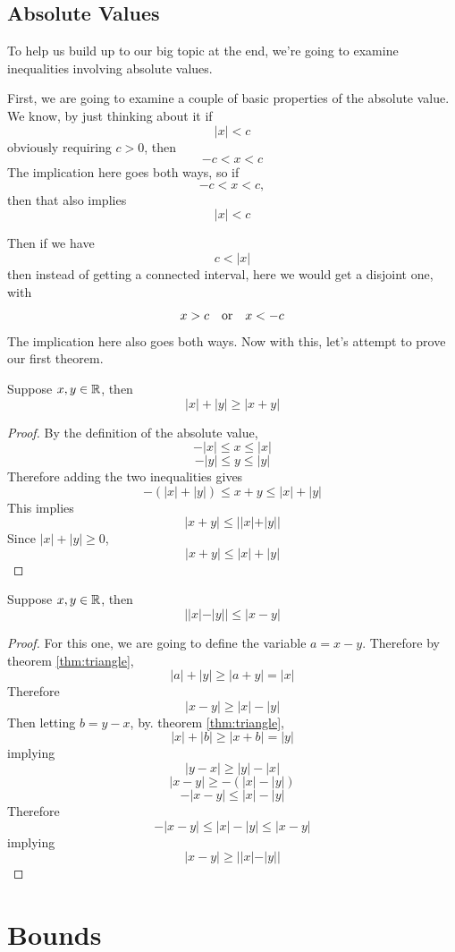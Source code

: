 \subsection{Absolute Values}
To help us build up to our big topic at the end, we're going to examine inequalities involving absolute values.

First, we are going to examine a couple of basic properties of the absolute value. We know, by just thinking about it if
$$|x|<c$$
obviously requiring $c>0$, then
$$-c<x<c$$
The implication here goes both ways, so if
$$-c<x<c,$$
then that also implies
$$|x|<c$$

Then if we have
$$c<|x|$$
then instead of getting a connected interval, here we would get a disjoint one, with
$$x>c \quad\text{or}\quad x < -c$$
The implication here also goes both ways. Now with this, let's attempt to prove our first theorem.

\begin{theorem}
	Suppose $x,y\in\mathbb{R}$, then
	$$|x|+|y|\ge |x+y|$$
	\label{thm:triangle}
\end{theorem}
\begin{proof}
	By the definition of the absolute value,
	$$-|x|\le x \le |x|$$
	$$-|y|\le y \le |y|$$
	Therefore adding the two inequalities gives
	$$-(|x|+|y|)\le x+y \le |x|+|y|$$
	This implies
	$$|x+y|\le ||x|+|y||$$
	Since $|x|+|y|\ge 0$,
	$$|x+y|\le |x|+|y|$$
\end{proof}

\begin{cor}
	Suppose $x,y\in\mathbb{R}$, then
	$$||x|-|y||\le |x-y|$$
	\label{cor:invtri}
\end{cor}
\begin{proof}
	For this one, we are going to define the variable $a=x-y$. Therefore by theorem \eqref{thm:triangle},
	$$|a|+|y|\ge|a+y|=|x|$$
	Therefore
	$$|x-y|\ge |x|-|y|$$
	Then letting $b=y-x$, by. theorem \eqref{thm:triangle},
	$$|x|+|b|\ge|x+b|=|y|$$
	implying
	$$|y-x|\ge|y|-|x|$$
	$$|x-y|\ge-(|x|-|y|)$$
	$$-|x-y|\le |x|-|y|$$
	Therefore
	$$-|x-y|\le |x|-|y|\le |x-y|$$
	implying
	$$|x-y|\ge ||x|-|y||$$
\end{proof}

\section{Bounds}
